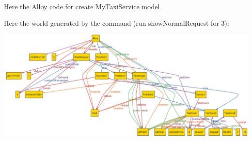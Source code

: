 Here the Alloy code for create MyTaxiService model


Here the world generated by the command (run showNormalRequest for 3):
\begin{center}
	\includegraphics[width=\textwidth]{alloy/diagram.png}
\end{center}